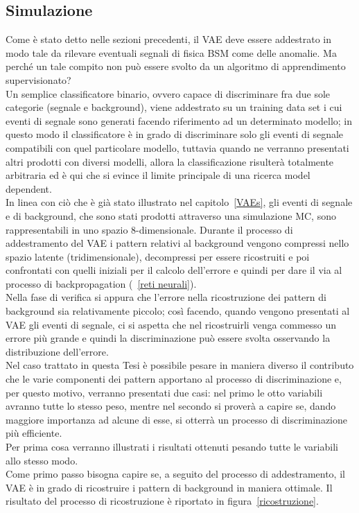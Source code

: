 \subsection{Simulazione}
\label{simulazione}
Come è stato detto nelle sezioni precedenti, il VAE deve essere addestrato in modo tale da rilevare eventuali segnali di fisica BSM come delle anomalie. Ma perché un tale compito non può essere svolto da un algoritmo di apprendimento supervisionato?\\
Un semplice classificatore binario, ovvero capace di discriminare fra due sole categorie (segnale e background), viene addestrato su un training data set i cui eventi di segnale sono generati facendo riferimento ad un determinato modello; in questo modo il classificatore è in grado di discriminare solo gli eventi di segnale compatibili con quel particolare modello, tuttavia quando ne verranno presentati altri prodotti con diversi modelli, allora la classificazione risulterà totalmente arbitraria ed è qui che si evince il limite principale di una ricerca model dependent. \\
In linea con ciò che è già stato illustrato nel capitolo~\ref{VAEs}, gli eventi di segnale e di background, che sono stati prodotti attraverso una simulazione MC, sono rappresentabili in uno spazio 8-dimensionale. Durante il processo di addestramento del VAE i pattern relativi al background vengono compressi nello spazio latente (tridimensionale), decompressi per essere ricostruiti e poi confrontati con quelli iniziali per il calcolo dell'errore e quindi per dare il via al processo di backpropagation (~\ref{reti neurali}). \\
Nella fase di verifica si appura che l'errore nella ricostruzione dei pattern di background sia relativamente piccolo; così facendo, quando vengono presentati al VAE gli eventi di segnale, ci si aspetta che nel ricostruirli venga commesso un errore più grande e quindi la discriminazione può essere svolta osservando la distribuzione dell'errore. \\
Nel caso trattato in questa Tesi è possibile pesare in maniera diverso il contributo che le varie componenti dei pattern apportano al processo di discriminazione e, per questo motivo, verranno presentati due casi: nel primo le otto variabili avranno tutte lo stesso peso, mentre nel secondo si proverà a capire se, dando maggiore importanza ad alcune di esse, si otterrà un processo di discriminazione più efficiente. \\ 
Per prima cosa verranno illustrati i risultati ottenuti pesando tutte le variabili allo stesso modo. \\
Come primo passo bisogna capire se, a seguito del processo di addestramento, il VAE è in grado di ricostruire i pattern di background in maniera ottimale. Il risultato del processo di ricostruzione è riportato in figura~\ref{ricostruzione}. 

